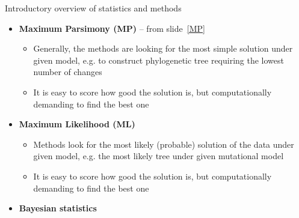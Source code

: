 \documentclass[compress, ucs, xelatex, 11pt, xcolor=svgnames,
  hyperref={
    bookmarks=true,
    unicode=true,
    colorlinks=true,
    pdftitle={Molecular data in R},
    plainpages=false,
    pdfauthor={Vojtech Zeisek},
    pdfsubject={Course about phylogeny and evolution in R},
    pdfcreator={XeLaTeX},
    pdfkeywords={R, evolution, phylogeny, molecular data},
    linkcolor=Tomato,
    anchorcolor=SaddleBrown,
    citecolor=Goldenrod,
    filecolor=DarkMagenta,
    menucolor=Sienna,
    urlcolor=DarkTurquoise,
    pdftex},
  url={hyphens, lowtilde} %
  ]{beamer}
\begin{document}
\begin{frame}[allowframebreaks]{Introductory overview of statistics and methods}
\begin{itemize}
    \begin{itemize}
      \item Two variables are easily displayable in 2D xy-scatter plot (we can calculate correlation, whatever)
      \item In molecular data, each locus is more or less independent variable -- 1000~bp alignment has 1000 variables: How to display plot with 1000 axes to be able to really see something?
      \item Methods like Principal Component Analysis (\textbf{PCA}), Non-Metric Multidimensional Scaling (\textbf{NMDS}) or \textbf{PCoA} look for correlations between pairs of variables to reduce them into new variables -- after many steps new uncorrelated variables retaining maximum of original variability are constructed
      \item New variables are sorted according amount of variability they show (the decrease is very steep -- first 1-4~axes are usually enough) -- it is possible to display xy-scatter plot showing most of variability of the data
      \item Good for data display and creation of hypotheses -- not to verify them (there is no statistical test)
      \item Data are commonly scaled -- all variables are in same scale
    \end{itemize}
    \item \textbf{Maximum Parsimony (MP)} -- from slide~\ref{MP}
    \begin{itemize}
      \item Generally, the methods are looking for the most simple solution under given model, e.g. to construct phylogenetic tree requiring the lowest number of changes
      \item It is easy to score how good the solution is, but computationally demanding to find the best one
    \end{itemize}
    \item \textbf{Maximum Likelihood (ML)}
    \begin{itemize}
      \item Methods look for the most likely (probable) solution of the data under given model, e.g. the most likely tree under given mutational model
      \item It is easy to score how good the solution is, but computationally demanding to find the best one
    \end{itemize}
    \item \textbf{Bayesian statistics}

\end{itemize}
\end{frame}
\end{document}

